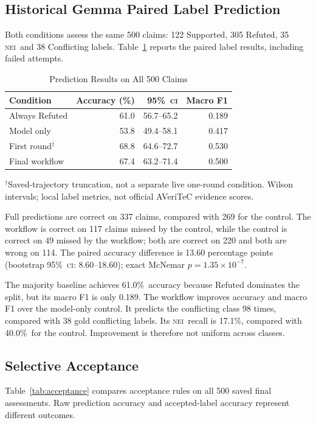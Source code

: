 \documentclass[conference]{IEEEtran}
\newcommand{\NEI}{\textsc{nei}}
\newcommand{\CI}{\textsc{ci}}
\newcommand{\pct}{\%}
\begin{document}
\subsection{Historical Gemma Paired Label Prediction}
Both conditions assess the same 500 claims: 122 Supported, 305 Refuted, 35 \NEI\ and 38 Conflicting labels. Table~\ref{tab:prediction} reports the paired label results, including failed attempts.

\begin{table}[t]
\caption{Prediction Results on All 500 Claims}
\label{tab:prediction}
\centering
\footnotesize
\begin{tabular}{@{}lrrr@{}}
\toprule
Condition & Accuracy (\pct) & 95\pct\ \CI & Macro F1\\
\midrule
Always Refuted & 61.0 & 56.7--65.2 & 0.189\\
Model only & 53.8 & 49.4--58.1 & 0.417\\
First round$^{\dagger}$ & 68.8 & 64.6--72.7 & 0.530\\
Final workflow & 67.4 & 63.2--71.4 & 0.500\\
\bottomrule
\end{tabular}
\par\smallskip
\parbox{\columnwidth}{\footnotesize $^{\dagger}$Saved-trajectory truncation, not a separate live one-round condition. Wilson intervals; local label metrics, not official AVeriTeC evidence scores.}
\end{table}

Full predictions are correct on 337 claims, compared with 269 for the control. The workflow is correct on 117 claims missed by the control, while the control is correct on 49 missed by the workflow; both are correct on 220 and both are wrong on 114. The paired accuracy difference is 13.60 percentage points (bootstrap 95\pct\ \CI: 8.60--18.60); exact McNemar \(p=1.35\times 10^{-7}\).

The majority baseline achieves 61.0\pct\ accuracy because Refuted dominates the split, but its macro F1 is only 0.189. The workflow improves accuracy and macro F1 over the model-only control. It predicts the conflicting class 98 times, compared with 38 gold conflicting labels. Its \NEI\ recall is 17.1\pct, compared with 40.0\pct\ for the control. Improvement is therefore not uniform across classes.

\subsection{Selective Acceptance}
Table~\ref{tab:acceptance} compares acceptance rules on all 500 saved final assessments. Raw prediction accuracy and accepted-label accuracy represent different outcomes.
\end{document}
